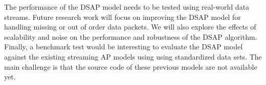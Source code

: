 
The performance of the DSAP model needs to be tested using real-world data streams. Future research work will focus on improving the DSAP model for handling missing or out of order data packets. We will also explore the effects of scalability and noise on the performance and robustness of the DSAP algorithm. Finally, a benchmark test would be interesting to evaluate the DSAP model against the existing streaming AP models using using standardized data sets. The main challenge is that the source code of these previous models are not available yet. 









